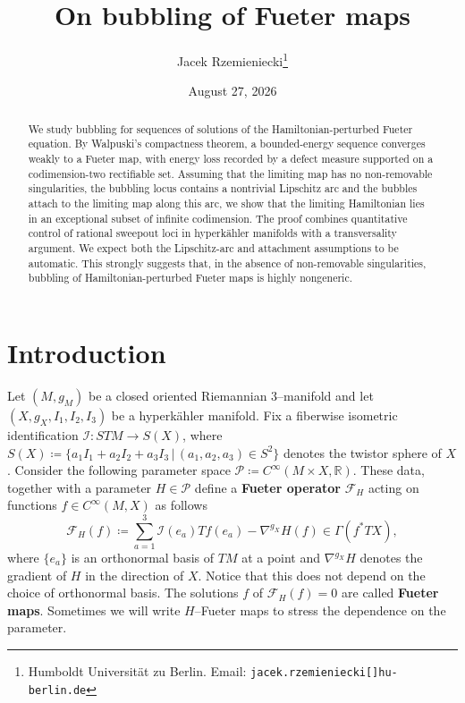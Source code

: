 \documentclass[11pt,a4paper]{article}
\title{On bubbling of Fueter maps}
\author{Jacek Rzemieniecki\thanks{Humboldt Universit\"at zu Berlin. Email: \texttt{jacek.rzemieniecki[]hu-berlin.de}}
}
\date{August 27, 2026}
\theoremstyle{definition}
\newcommand{\cF}{\mathcal{F}}
\newcommand{\cI}{\mathcal{I}}
\newcommand{\cP}{\mathcal{P}}
\newcommand{\bR}{\mathbb{R}}
\begin{document}
\maketitle\vspace{-2em}
\begin{abstract}

We study bubbling for sequences of solutions of the Hamiltonian-perturbed Fueter equation. By Walpuski's compactness theorem, a bounded-energy sequence converges weakly to a Fueter map, with energy loss recorded by a defect measure supported on a codimension-two rectifiable set. Assuming that the limiting map has no non-removable singularities, the bubbling locus contains a nontrivial Lipschitz arc and the bubbles attach to the limiting map along this arc, we show that the limiting Hamiltonian lies in an exceptional subset of infinite codimension. The proof combines quantitative control of rational sweepout loci in hyperkähler manifolds with a transversality argument. We expect both the Lipschitz-arc and attachment assumptions to be automatic. This strongly suggests that, in the absence of non-removable singularities, bubbling of Hamiltonian-perturbed Fueter maps is highly nongeneric.
\end{abstract}

\section{Introduction}

Let $(M, g_M)$ be a closed oriented Riemannian $3$--manifold and let $(X, g_X, I_1, I_2, I_3)$ be a hyperk\"ahler manifold. Fix a fiberwise isometric identification $\cI: STM \to S(X)$, where $S(X)\coloneq \{ a_1 I_1+ a_2 I_2 + a_3 I_3 \, | \, (a_1, a_2, a_3) \in S^2\}$ denotes the twistor sphere of $X$. Consider the following parameter space $\cP \coloneq C^\infty(M \times X, \bR)$. These data, together with a parameter $H \in \cP$ define a \textbf{Fueter operator} $\cF_{H}$ acting on functions $f\in C^\infty(M, X)$ as follows
\begin{equation}\label{perturbed Fueter equation}
    \cF_{H} (f) \coloneq \sum_{a=1}^3 \cI(e_a) Tf(e_a) - \nabla^{g_X} H(f) \in \Gamma(f^*TX),
\end{equation} 
where $\{e_a\}$ is an orthonormal basis of $TM$ at a point and $\nabla^{g_X} H$ denotes the gradient of $H$ in the direction of $X$. Notice that this does not depend on the choice of orthonormal basis. The solutions $f$ of $\cF_{H} (f) = 0$ are called \textbf{Fueter maps}. Sometimes we will write $H$--Fueter maps to stress the dependence on the parameter.
\end{document}

